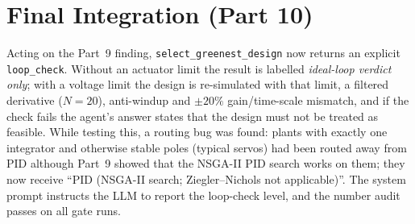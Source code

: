 \documentclass[a4paper,11pt]{article}
\begin{document}
\section{Final Integration (Part 10)}
Acting on the Part~9 finding, \texttt{select\_greenest\_design} now returns an explicit \texttt{loop\_check}. Without an actuator limit the result is labelled \emph{ideal-loop verdict only}; with a voltage limit the design is re-simulated with that limit, a filtered derivative ($N=20$), anti-windup and $\pm20\%$ gain/time-scale mismatch, and if the check fails the agent's answer states that the design must not be treated as feasible. While testing this, a routing bug was found: plants with exactly one integrator and otherwise stable poles (typical servos) had been routed away from PID although Part~9 showed that the NSGA-II PID search works on them; they now receive ``PID (NSGA-II search; Ziegler--Nichols not applicable)''. The system prompt instructs the LLM to report the loop-check level, and the number audit passes on all gate runs.
\end{document}
